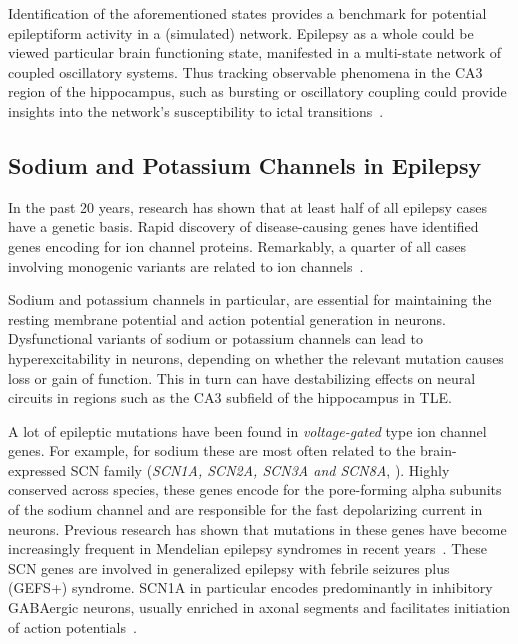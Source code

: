 \noindent
Identification of the aforementioned states provides a benchmark for potential epileptiform activity in a (simulated) network.
Epilepsy as a whole could be viewed particular brain functioning state, manifested in a multi-state network of coupled oscillatory systems.
Thus tracking observable phenomena in the CA3 region of the hippocampus, such as bursting or oscillatory coupling could provide insights 
into the network's susceptibility to ictal transitions~\parencite{kalitzinEpilepsyManifestationMultistate2019a}.

\subsection{Sodium and Potassium Channels in Epilepsy}
In the past 20 years, research has shown that at least half of all epilepsy cases have a genetic basis.
Rapid discovery of disease-causing genes have identified genes encoding for ion channel proteins.
Remarkably, a quarter of all cases involving monogenic variants are related to ion channels~\parencite{strianoGeneticTestingPrecision2020,oyrerIonChannelsGenetic2018}.

Sodium and potassium channels in particular, are essential for maintaining the resting
membrane potential and action potential generation in neurons.
Dysfunctional variants of sodium or potassium channels can lead to hyperexcitability in neurons, depending on whether the relevant mutation causes loss or gain of function.
This in turn can have destabilizing effects on neural circuits in regions such as the CA3 subfield of the hippocampus in TLE\@.

A lot of epileptic mutations have been found in \textit{voltage-gated} type ion channel genes.
For example, for sodium these are most often related to the brain-expressed SCN family (\textit{SCN1A, SCN2A, SCN3A and SCN8A}, \textcite{brunklausSodiumChannelEpilepsies2020}).
Highly conserved across species, these genes encode for the pore-forming alpha subunits of the sodium channel and are responsible for the fast depolarizing current in neurons.
Previous research has shown that mutations in these genes have become increasingly frequent in Mendelian epilepsy syndromes in recent years~\parencite{brunklausSodiumChannelEpilepsies2020}. 
These SCN genes are involved in generalized epilepsy with febrile seizures plus (GEFS+) syndrome.
SCN1A in particular encodes predominantly in inhibitory GABAergic neurons, usually enriched in axonal segments and facilitates initiation of action potentials~\parencite{yuReducedSodiumCurrent2006}.

